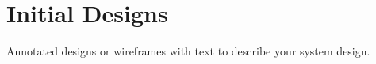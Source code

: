 \documentclass[requirements.tex]{subfiles}
\begin{document}
\section{Initial Designs} %
\label{sec:initial_designs}
Annotated designs or wireframes with text to describe your system design.
\newpage
\end{document}
